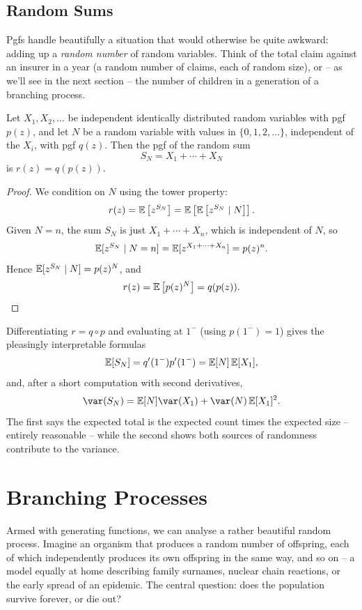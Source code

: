 \documentclass[a4paper]{scrartcl}
\begin{document}
\subsection{Random Sums}

Pgfs handle beautifully a situation that would otherwise be quite awkward: adding up a \emph{random number} of random variables. Think of the total claim against an insurer in a year (a random number of claims, each of random size), or -- as we'll see in the next section -- the number of children in a generation of a branching process.

\begin{theorem}
	Let $X_1, X_2, \dots$ be independent identically distributed random variables with pgf $p(z)$, and let $N$ be a random variable with values in $\{0, 1, 2, \dots\}$, independent of the $X_i$, with pgf $q(z)$. Then the pgf of the random sum
	$$
	S_N = X_1 + \cdots + X_N
	$$
	is $r(z) = q(p(z))$.
\end{theorem}
\begin{proof}
	We condition on $N$ using the tower property:
	$$
	r(z) = \mathbb{E}\left[z^{S_N}\right] = \mathbb{E}\left[\mathbb{E}\left[z^{S_N} \mid N\right]\right].
	$$
	Given $N = n$, the sum $S_N$ is just $X_1 + \cdots + X_n$, which is independent of $N$, so
	$$
	\mathbb{E}[z^{S_N} \mid N = n] = \mathbb{E}[z^{X_1 + \cdots + X_n}] = p(z)^n.
	$$
	Hence $\mathbb{E}[z^{S_N} \mid N] = p(z)^N$, and
	$$
	r(z) = \mathbb{E}\left[p(z)^N\right] = q(p(z)). \qedhere
	$$
\end{proof}

Differentiating $r = q \circ p$ and evaluating at $1^-$ (using $p(1^-) = 1$) gives the pleasingly interpretable formulas
$$
\mathbb{E}[S_N] = q'(1^-)p'(1^-) = \mathbb{E}[N]\,\mathbb{E}[X_1],
$$
and, after a short computation with second derivatives,
$$
\var(S_N) = \EE[N]\var(X_1) + \var(N)\,\EE[X_1]^2.
$$
The first says the expected total is the expected count times the expected size -- entirely reasonable -- while the second shows both sources of randomness contribute to the variance.


\section{Branching Processes}

Armed with generating functions, we can analyse a rather beautiful random process. Imagine an organism that produces a random number of offspring, each of which independently produces its own offspring in the same way, and so on -- a model equally at home describing family surnames, nuclear chain reactions, or the early spread of an epidemic. The central question: does the population survive forever, or die out?
\end{document}
